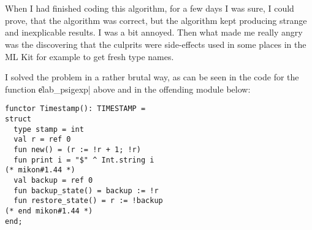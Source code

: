 \subsection{\secimpltraces}
\label{sec:impl_traces}
 

\section{\secanegdote}
\label{sec:anegdote}

When I had finished coding this algorithm, for a few days I was sure, I could prove,
that the algorithm was correct, but the algorithm kept producing strange
and inexplicable results. I was a bit annoyed. Then what made me really angry
was the discovering that the culprits were side-effects used in some places
in the ML Kit for example to get fresh type names.

I solved the problem in a rather brutal way, as can be seen
in the code for the function \|elab_psigexp| above
and in the offending module below:
{\small
\begin{verbatim}
functor Timestamp(): TIMESTAMP =
struct
  type stamp = int
  val r = ref 0
  fun new() = (r := !r + 1; !r)
  fun print i = "$" ^ Int.string i
(* mikon#1.44 *)
  val backup = ref 0
  fun backup_state() = backup := !r
  fun restore_state() = r := !backup
(* end mikon#1.44 *)
end; 
\end{verbatim} 
} %


















